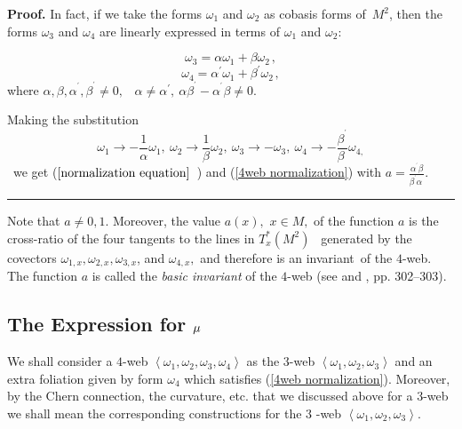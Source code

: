 \documentclass{article}
\newenvironment{proof}[1][Proof]{\noindent\textbf{#1.} }{\ \rule{0.5em}{0.5em}}
\begin{document}
\bigskip

\begin{proof}
\bigskip In fact, if we take the forms $\omega _{1}$ and $\omega _{2}$ as
cobasis forms of\ $M^{2}$, then the forms $\omega _{3}$ and $\omega _{4}$
are linearly expressed in terms of $\omega _{1}$ and $\omega _{2}:$

\begin{equation*}
\omega _{3}=\alpha \omega _{1}+\beta \omega _{2\,},
\end{equation*}
\begin{equation*}
\omega _{4}=\alpha ^{\prime }\omega _{1}+\beta ^{\prime }\omega _{2\,},
\end{equation*}%
where $\alpha ,\beta ,\alpha ^{^{\prime }},\beta ^{^{\prime }}\neq 0,$%
{\normalsize \ }$\alpha \neq \alpha ^{\prime },\ \alpha \beta ^{^{\prime
}}-\alpha ^{^{\prime }}\beta \neq 0.$

Making the substitution
\begin{equation*}
\omega _{1}\rightarrow -\frac{1}{\alpha }\omega _{1},\ \omega
_{2}\rightarrow \frac{1}{\beta }\omega _{2},\ \omega _{3}\rightarrow -\omega
_{3},\ \omega _{4}\rightarrow -\frac{\beta ^{^{\prime }}}{\beta \mathrm{\ }}%
\omega _{4,}
\end{equation*}%
{\normalsize \ }we get ($\ref{normalization equation}$\ ) and (\ref{4web
normalization}) with $a=\frac{\alpha ^{^{\prime }}\beta }{\beta ^{^{\prime
}}\alpha \mathrm{\ }}$.
\end{proof}

Note that $a\neq 0,1.$ Moreover, the value $a\left( x\right) ,$ $x\in M,$ of
the function $a$ is the cross-ratio of the four tangents to the lines in $%
T_{x}^{\ast }(M^{2})$ \ generated by the covectors $\omega _{1,x},\omega
_{2,x},\omega _{3,x}$, and $\omega _{4,x},$ and therefore is an invariant\
of the $4$-web. The function $a$ is called the \emph{basic invariant }of the
$4$-web (see \cite{G 80} and \cite{G 88}, pp. 302--303).

\subsection{The Expression for $\protect\mu $}

We shall consider a $4$-web $\left\langle \omega _{1},\omega _{2},\omega
_{3},\omega _{4}\right\rangle $ as the $3$-web $\left\langle \omega
_{1},\omega _{2},\omega _{3}\right\rangle $ and an extra foliation given by
form $\omega _{4}$ which satisfies {\normalsize (\ref{4web normalization}).}
Moreover, by the Chern connection, the curvature, etc. that we discussed
above for a $3$-web we shall mean the corresponding constructions for the $3$%
-web $\left\langle \omega _{1},\omega _{2},\omega _{3}\right\rangle .$
\end{document}
